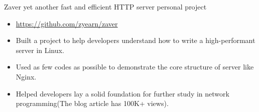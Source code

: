 \documentclass[11pt,a4paper]{moderncv}
\begin{document}
{Zaver}
{yet another fast and efficient HTTP server}
{personal project}
{}
{
\begin{itemize}
    \item \url{https://github.com/zyearn/zaver}
    \item Built a project to help developers understand how to write a high-performant server in Linux.
    \item Used as few codes as possible to demonstrate the core structure of server like Nginx.
    \item Helped developers lay a solid foundation for further study in network programming(The blog article has 100K+ views).
\end{itemize}
}


%
%
\end{document}

